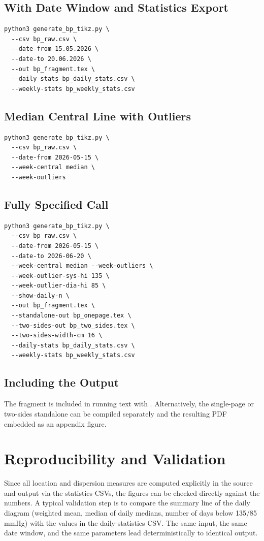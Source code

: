 \documentclass[conference]{IEEEtran}
\begin{document}
\subsection{With Date Window and Statistics Export}
\begin{lstlisting}[style=sh]
python3 generate_bp_tikz.py \
  --csv bp_raw.csv \
  --date-from 15.05.2026 \
  --date-to 20.06.2026 \
  --out bp_fragment.tex \
  --daily-stats bp_daily_stats.csv \
  --weekly-stats bp_weekly_stats.csv
\end{lstlisting}

\subsection{Median Central Line with Outliers}
\begin{lstlisting}[style=sh]
python3 generate_bp_tikz.py \
  --csv bp_raw.csv \
  --date-from 2026-05-15 \
  --week-central median \
  --week-outliers
\end{lstlisting}

\subsection{Fully Specified Call}
\begin{lstlisting}[style=sh]
python3 generate_bp_tikz.py \
  --csv bp_raw.csv \
  --date-from 2026-05-15 \
  --date-to 2026-06-20 \
  --week-central median --week-outliers \
  --week-outlier-sys-hi 135 \
  --week-outlier-dia-hi 85 \
  --show-daily-n \
  --out bp_fragment.tex \
  --standalone-out bp_onepage.tex \
  --two-sides-out bp_two_sides.tex \
  --two-sides-width-cm 16 \
  --daily-stats bp_daily_stats.csv \
  --weekly-stats bp_weekly_stats.csv
\end{lstlisting}

\subsection{Including the Output}
The fragment is included in running text with \verb||.
Alternatively, the single-page or two-sides standalone can be compiled
separately and the resulting PDF embedded as an appendix figure.

\section{Reproducibility and Validation}
Since all location and dispersion measures are computed explicitly in the source
and output via the statistics CSVs, the figures can be checked directly against
the numbers. A typical validation step is to compare the summary line of the
daily diagram (weighted mean, median of daily medians, number of days below
135/85\,mmHg) with the values in the daily-statistics CSV. The same input, the
same date window, and the same parameters lead deterministically to identical
output.
\end{document}

